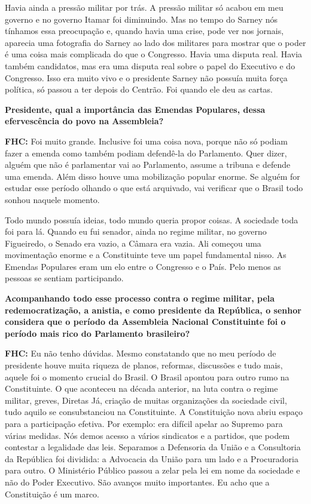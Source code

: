 Havia ainda a pressão militar por trás. A pressão militar só acabou em
meu governo e no governo Itamar foi diminuindo. Mas no tempo do Sarney
nós tínhamos essa preocupação e, quando havia uma crise, pode ver nos
jornais, aparecia uma fotografia do Sarney ao lado dos militares para
mostrar que o poder é uma coisa mais complicada do que o Congresso.
Havia uma disputa real. Havia também candidatos, mas era uma disputa
real sobre o papel do Executivo e do Congresso. Isso era muito vivo e o
presidente Sarney não possuía muita força política, só passou a ter
depois do Centrão. Foi quando ele deu as cartas.

\textbf{Presidente, qual a importância das Emendas Populares, dessa
efervescência do povo na Assembleia? }

\textbf{FHC:} Foi muito grande. Inclusive foi uma coisa nova, porque não
só podiam fazer a emenda como também podiam defendê-la do Parlamento.
Quer dizer, alguém que não é parlamentar vai ao Parlamento, assume a
tribuna e defende uma emenda. Além disso houve uma mobilização popular
enorme. Se alguém for estudar esse período olhando o que está arquivado,
vai verificar que o Brasil todo sonhou naquele momento.

Todo mundo possuía ideias, todo mundo queria propor coisas. A sociedade
toda foi para lá. Quando eu fui senador, ainda no regime militar, no
governo Figueiredo, o Senado era vazio, a Câmara era vazia. Ali começou
uma movimentação enorme e a Constituinte teve um papel fundamental
nisso. As Emendas Populares eram um elo entre o Congresso e o País. Pelo
menos as pessoas se sentiam participando.

\textbf{Acompanhando todo esse processo contra o regime militar, pela
redemocratização, a anistia, e como presidente da República, o senhor
considera que o período da Assembleia Nacional Constituinte foi o
período mais rico do Parlamento brasileiro?}

\textbf{FHC:} Eu não tenho dúvidas. Mesmo constatando que no meu período
de presidente houve muita riqueza de planos, reformas, discussões e tudo
mais, aquele foi o momento crucial do Brasil. O Brasil apontou para
outro rumo na Constituinte. O que aconteceu na década anterior, na luta
contra o regime militar, greves, Diretas Já, criação de muitas
organizações da sociedade civil, tudo aquilo se consubstanciou na
Constituinte. A Constituição nova abriu espaço para a participação
efetiva. Por exemplo: era difícil apelar ao Supremo para várias medidas.
Nós demos acesso a vários sindicatos e a partidos, que podem contestar a
legalidade das leis. Separamos a Defensoria da União e a Consultoria da
República foi dividida: a Advocacia da União para um lado e a
Procuradoria para outro. O Ministério Público passou a zelar pela lei em
nome da sociedade e não do Poder Executivo. São avanços muito
importantes. Eu acho que a Constituição é um marco.

